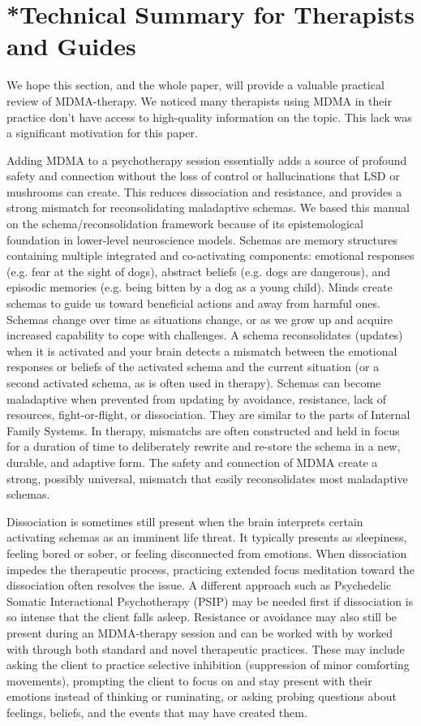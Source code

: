 \documentclass[12pt,letterpaper]{article}
\begin{document}
\section{*Technical Summary for Therapists and Guides}
We hope this section, and the whole paper, will provide a valuable practical review of MDMA-therapy. We noticed many therapists using MDMA in their practice don't have access to high-quality information on the topic. This lack was a significant motivation for this paper.

Adding MDMA to a psychotherapy session essentially adds a source of profound safety and connection without the loss of control or hallucinations that LSD or mushrooms can create. This reduces dissociation and resistance, and provides a strong mismatch for reconsolidating maladaptive schemas. We based this manual on the schema/reconsolidation framework because of its epistemological foundation in lower-level neuroscience models. Schemas are memory structures containing multiple integrated and co-activating components: emotional responses (e.g. fear at the sight of dogs), abstract beliefs (e.g. dogs are dangerous), and episodic memories (e.g. being bitten by a dog as a young child). Minds create schemas to guide us toward beneficial actions and away from harmful ones. Schemas change over time as situations change, or as we grow up and acquire increased capability to cope with challenges. A schema reconsolidates (updates) when it is activated and your brain detects a mismatch between the emotional responses or beliefs of the activated schema and the current situation (or a second activated schema, as is often used in therapy). Schemas can become maladaptive when prevented from updating by avoidance, resistance, lack of resources, fight-or-flight, or dissociation. They are similar to the parts of Internal Family Systems. In therapy, mismatchs are often constructed and held in focus for a duration of time to deliberately rewrite and re-store the schema in a new, durable, and adaptive form. The safety and connection of MDMA create a strong, possibly universal, mismatch that easily reconsolidates most maladaptive schemas.

Dissociation is sometimes still present when the brain interprets certain activating schemas as an imminent life threat. It typically presents as sleepiness, feeling bored or sober, or feeling disconnected from emotions. When dissociation impedes the therapeutic process, practicing extended focus meditation toward the dissociation often resolves the issue. A different approach such as Psychedelic Somatic Interactional Psychotherapy (PSIP) may be needed first if dissociation is so intense that the client falls asleep. Resistance or avoidance may also still be present during an MDMA-therapy session and can be worked with by worked with through both standard and novel therapeutic practices. These may include asking the client to practice selective inhibition (suppression of minor comforting movements), prompting the client to focus on and stay present with their emotions instead of thinking or ruminating, or asking probing questions about feelings, beliefs, and the events that may have created them.
\end{document}
